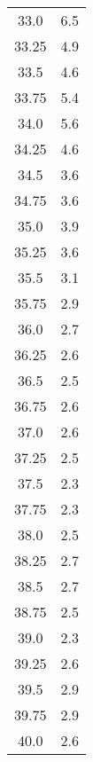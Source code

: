 \begin{table}
\begin{tabular}{S[]S[]}
33.0 & 6.5\\
33.25 & 4.9\\
33.5 & 4.6\\
33.75 & 5.4\\
34.0 & 5.6\\
34.25 & 4.6\\
34.5 & 3.6\\
34.75 & 3.6\\
35.0 & 3.9\\
35.25 & 3.6\\
35.5 & 3.1\\
35.75 & 2.9\\
36.0 & 2.7\\
36.25 & 2.6\\
36.5 & 2.5\\
36.75 & 2.6\\
37.0 & 2.6\\
37.25 & 2.5\\
37.5 & 2.3\\
37.75 & 2.3\\
38.0 & 2.5\\
38.25 & 2.7\\
38.5 & 2.7\\
38.75 & 2.5\\
39.0 & 2.3\\
39.25 & 2.6\\
39.5 & 2.9\\
39.75 & 2.9\\
40.0 & 2.6\\
\bottomrule
\end{tabular}\end{table}